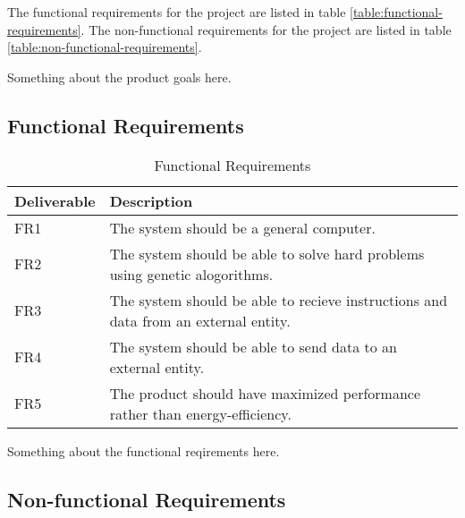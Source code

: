 
The functional requirements for the project are listed in table \vref{table:functional-requirements}. The non-functional requirements for the project are listed in table \vref{table:non-functional-requirements}.


Something about the product goals here.


 \subsection{Functional Requirements}

 \begin{table}
 \begin{center}
 \begin{tabular}{| l | l |}
 \hline
 Deliverable & Description \\
 \hline
 FR1 & The system should be a general computer.\\
 FR2 & The system should be able to solve hard problems using genetic alogorithms.\\
 FR3 & The system should be able to recieve instructions and data from an external entity.\\
 FR4 & The system should be able to send data to an external entity.\\
 FR5 & The product should have maximized performance rather than energy-efficiency. \\
 \hline
 \end{tabular}
 \caption{Functional Requirements}
 \label{table:functional-requirements}
 \end{center}
 \end{table}

 Something about the functional reqirements here.

 \subsection{Non-functional Requirements}

